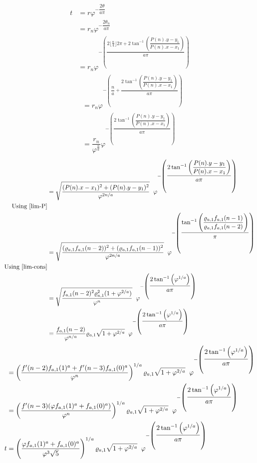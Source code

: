 \documentclass[preprint,12pt]{elsarticle}
\begin{document}
\begin{align*}
t &= r\varphi^{-\dfrac{2\theta}{a\pi}}\\
&= r_n\varphi^{-\dfrac{2\theta_n}{a\pi}}\\
&= r_n\varphi^{-\left(\dfrac{2\lfloor\frac{n}{4}\rfloor2\pi + 2\tan^{-1}{\left(\dfrac{P(n).y-y_1}{P(n).x - x_1}\right)}}{a\pi}\right)}
\end{align*}
\begin{align*}
&= r_n\varphi^{-\left(\dfrac{n}{a} + \dfrac{ 2\tan^{-1}{\left(\dfrac{P(n).y-y_1}{P(n).x - x_1}\right)}}{a\pi}\right)}\\
&= \dfrac{r_n}{\varphi^{\frac{n}{a}}}\varphi^{-\left(\dfrac{ 2\tan^{-1}{\left(\dfrac{P(n).y-y_1}{P(n).x - x_1}\right)}}{a\pi}\right)}
\end{align*}
\begin{align*}
&= \sqrt{\dfrac{(P(n).x-x_1)^2 + (P(n).y-y_1)^2}{\varphi^{2n/a}}}\hspace{2mm}\varphi^{-\left(\dfrac{ 2\tan^{-1}{\left(\dfrac{P(n).y-y_1}{P(n).x - x_1}\right)}}{a\pi}\right)}\\
\text{Using \ref{lim-P}}\\
&= \sqrt{\dfrac{(\varrho_{a,1}f_{a,1}(n-2))^2 + (\varrho_{a,1}f_{a,1}(n-1))^2}{\varphi^{2n/a}}}\hspace{2mm}\varphi^{-\left(\dfrac{ \tan^{-1}{\left(\dfrac{\varrho_{a,1}f_{a,1}(n-1)}{\varrho_{a,1}f_{a,1}(n-2)}\right)}}{\pi}\right)}\\
\text{Using \ref{lim-cons}}\\
&= \sqrt{\dfrac{f_{a,1}(n-2)^2 \varrho_{a,1}^2(1 + \varphi^{2/a})}{\varphi^n}}\hspace{2mm}\varphi^{-\left(\dfrac{ 2\tan^{-1}{\left(\varphi^{1/a}\right)}}{a\pi}\right)}\\
&= \dfrac{f_{a,1}(n-2) }{\varphi^{n/a}}\varrho_{a,1}\sqrt{1 + \varphi^{2/a}}\hspace{2mm}\varphi^{-\left(\dfrac{ 2\tan^{-1}{\left(\varphi^{1/a}\right)}}{a\pi}\right)}
\end{align*}
\clearpage
\begin{align*}
	&=\left(\dfrac{f'(n-2)f_{a,1}(1)^a+f'(n-3)f_{a,1}(0)^a}{\varphi^{n}}\right)^{1/a}\varrho_{a,1}\sqrt{1 + \varphi^{2/a}}\hspace{2mm}\varphi^{-\left(\dfrac{ 2\tan^{-1}{\left(\varphi^{1/a}\right)}}{a\pi}\right)}\\
	&=\left(\dfrac{f'(n-3)(\varphi f_{a,1}(1)^a+f_{a,1}(0)^a)}{\varphi^{n}}\right)^{1/a}\varrho_{a,1}\sqrt{1 + \varphi^{2/a}}\hspace{2mm}\varphi^{-\left(\dfrac{ 2\tan^{-1}{\left(\varphi^{1/a}\right)}}{a\pi}\right)}\\
	t&=\left(\dfrac{\varphi f_{a,1}(1)^a+f_{a,1}(0)^a}{\varphi^{3}\sqrt{5}}\right)^{1/a}\varrho_{a,1}\sqrt{1 + \varphi^{2/a}}\hspace{2mm}\varphi^{-\left(\dfrac{ 2\tan^{-1}{\left(\varphi^{1/a}\right)}}{a\pi}\right)}
\end{align*}
\end{document}
